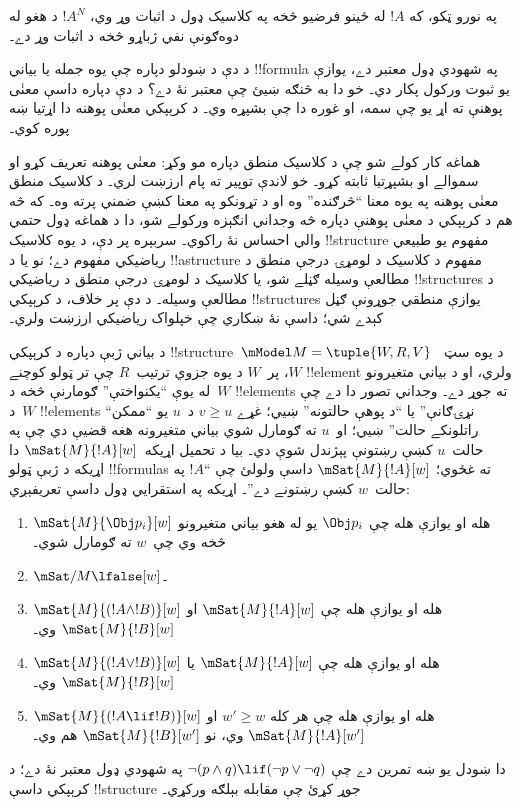 \documentclass[../../../include/open-logic-section]{subfiles}
\begin{document}
په نورو ټکو، که $!A$ له ځينو فرضيو څخه په کلاسیک ډول د اثبات وړ وي،
$!A^N$ د هغو له دوه‌ګونې نفي ژباړو څخه د اثبات وړ دے۔

د دې د ښودلو دپاره چې يوه جمله يا بياني !!{formula} په شهودي ډول
معتبر دے، يوازې يو ثبوت ورکول پکار دي۔ خو دا به څنګه ښيئ چې معتبر نۀ
دے؟ د دې دپاره داسې معنٰی پوهنې ته اړ يو چې سمه، او غوره دا چې بشپړه
وي۔ د کرېپکي معنٰی پوهنه دا اړتيا ښه پوره کوي۔

هماغه کار کولے شو چې د کلاسیک منطق دپاره مو وکړ: معنٰی پوهنه تعريف
کړو او سموالے او بشپړتيا ثابته کړو۔ خو لاندې توپير ته پام ارزښت لري۔
د کلاسیک منطق معنٰی پوهنه په يوه معنا ``څرګنده'' وه او د تړونکو په
معنا کښې ضمني پرته وه۔ که څه هم د کرېپکي د معنٰی پوهنې دپاره څه
وجداني انګېزه ورکولے شو، دا د هماغه ډول حتمي والي احساس نۀ راکوي۔
سربېره پر دې، د يوه کلاسیک !!{structure} مفهوم يو طبيعي رياضيکي
مفهوم دے؛ نو يا د !!a{structure} مفهوم د کلاسیک د لومړۍ درجې منطق د
مطالعې وسيله ګڼلے شو، يا کلاسیک د لومړۍ درجې منطق د رياضيکي
!!{structure}s د مطالعې وسيله۔ د دې پر خلاف، د کرېپکي !!{structure}s
يوازې منطقي جوړونې ګڼل کېدے شي؛ داسې نۀ ښکاري چې خپلواک رياضيکي ارزښت
ولري۔

د بياني ژبې دپاره د کرېپکي !!{structure}~$\mModel M = \tuple{W, R, V}$
د يوه سټ~$W$، پر~$W$ د يوه جزوي ترتيب~$R$ چې تر ټولو کوچنے
!!{element} ولري، او د بياني متغيرونو له يوې ``يکنواختې'' ګومارنې
څخه د~$W$ !!{element}s ته جوړ دے۔ وجداني تصور دا دے چې د~$W$
!!{element}s ``نړۍګانې'' يا ``د پوهې حالتونه'' ښيي؛ غړے
$v \geq u$ د~$u$ يو ``ممکن راتلونکے حالت'' ښيي؛ او~$u$ ته ګومارل شوي
بياني متغيرونه هغه قضيې دي چې په حالت~$u$ کښې رښتونې پېژندل شوې دي۔
بيا د تحميل اړيکه~$\mSat{M}{!A}[w]$ دا اړيکه د ژبې ټولو
!!{formula}s ته غځوي؛ $\mSat{M}{!A}[w]$ داسې ولولئ چې ``$!A$ په
حالت~$w$ کښې رښتونے دے''۔ اړيکه په استقرايي ډول داسې تعريفېږي:
\begin{enumerate}
\item $\mSat{M}{\Obj p_i}[w]$ هله او يوازې هله چې $\Obj p_i$ يو له
  هغو بياني متغيرونو څخه وي چې~$w$ ته ګومارل شوي۔
\item $\mSat/{M}{\lfalse}[w]$۔
\item $\mSat{M}{(!A \land !B)}[w]$ هله او يوازې هله چې
  $\mSat{M}{!A}[w]$ او $\mSat{M}{!B}[w]$ وي۔
\item $\mSat{M}{(!A \lor !B)}[w]$ هله او يوازې هله چې
  $\mSat{M}{!A}[w]$ يا $\mSat{M}{!B}[w]$ وي۔
\item $\mSat{M}{(!A \lif !B)}[w]$ هله او يوازې هله چې هر کله
  $w' \geq w$ او $\mSat{M}{!A}[w']$ وي، نو $\mSat{M}{!B}[w']$ هم وي۔
\end{enumerate}
دا ښودل يو ښه تمرين دے چې
$\lnot (p \land q) \lif (\lnot p \lor \lnot q)$ په شهودي ډول معتبر
نۀ دے؛ د کرېپکي داسې !!{structure} جوړ کړئ چې مقابله بېلګه ورکړي۔
\end{document}
